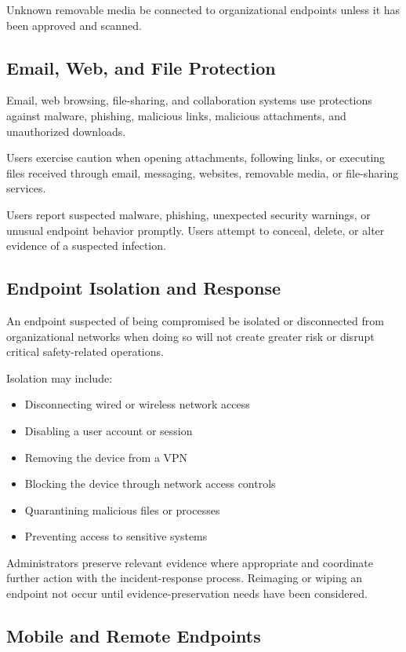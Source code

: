 Unknown removable media \mustnot{} be connected to organizational endpoints unless it has been approved and scanned.

\subsection{Email, Web, and File Protection}

Email, web browsing, file-sharing, and collaboration systems \should{} use protections against malware, phishing, malicious links, malicious attachments, and unauthorized downloads.

Users \must{} exercise caution when opening attachments, following links, or executing files received through email, messaging, websites, removable media, or file-sharing services.

Users \must{} report suspected malware, phishing, unexpected security warnings, or unusual endpoint behavior promptly. Users \mustnot{} attempt to conceal, delete, or alter evidence of a suspected infection.

\subsection{Endpoint Isolation and Response}

An endpoint suspected of being compromised \must{} be isolated or disconnected from organizational networks when doing so will not create greater risk or disrupt critical safety-related operations.

Isolation may include:
\begin{itemize}
    \item Disconnecting wired or wireless network access
    \item Disabling a user account or session
    \item Removing the device from a VPN
    \item Blocking the device through network access controls
    \item Quarantining malicious files or processes
    \item Preventing access to sensitive systems
\end{itemize}

Administrators \must{} preserve relevant evidence where appropriate and coordinate further action with the incident-response process. Reimaging or wiping an endpoint \should{} not occur until evidence-preservation needs have been considered.

\subsection{Mobile and Remote Endpoints}

